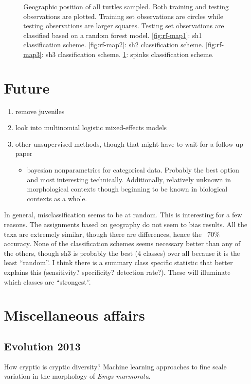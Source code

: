 \documentclass{article}\usepackage{graphicx, color}
\begin{document}
\begin{figure}[t]
\begin{subfigure}[b]{0.5\textwidth}
    \label{fig:rf-map4}
  \end{subfigure}
  \caption{Geographic position of all turtles sampled. Both training and testing observations are plotted. Training set observations are circles while testing observations are larger squares. Testing set observations are classified based on a random forest model. \ref{fig:rf-map1}: sh1 classification scheme. \ref{fig:rf-map2}: sh2 classification scheme. \ref{fig:rf-map3}: sh3 classification scheme. \ref{fig:rf-map4}: spinks classification scheme.}
  \label{fig:rf-map}
\end{figure}


\section{Future}
\begin{enumerate}
  \item remove juveniles
  \item look into multinomial logistic mixed-effects models
  \item other unsupervised methods, though that might have to wait for a follow up paper
    \begin{itemize}
      \item bayesian nonparametrics for categorical data. Probably the best option and most interesting technically. Additionally, relatively unknown in morphological contexts though beginning to be known in biological contexts as a whole.
    \end{itemize}
\end{enumerate}

In general, misclassification seems to be at random. This is interesting for a few reasons. The assignments based on geography do not seem to bias results. All the taxa are extremely similar, though there are differences, hence the ~70\% accuracy. None of the classification schemes seems necessary better than any of the others, though sh3 is probably the best (4 classes) over all because it is the least ``random''. I think there is a summary class specific statistic that better explains this (sensitivity? specificity? detection rate?). These will illuminate which classes are ``strongest''.

\section{Miscellaneous affairs}
\subsection{Evolution 2013}
How cryptic is cryptic diversity? Machine learning approaches to fine scale variation in the morphology of \textit{Emys marmorata}.
\end{document}
